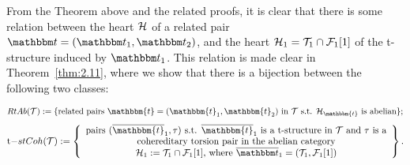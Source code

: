 From the Theorem above and the related proofs, it is clear that there is some relation between the heart
$\mathcal{H}$ of a related pair $\t=(\t_1,\t_2)$, and the heart $\mathcal{H}_1=\mathcal{T}_1\cap\mathcal{F}_1[1]$ of the t-structure induced by $\t_1$.
This relation is made clear in Theorem~\ref{thm:2.11}, where we show that there is a bijection between the following two classes:

\[RtAb(\mathcal{T}):=\{\text{related pairs }\mathbbm{t}=(\mathbbm{t}_1,\mathbbm{t}_2)
\text{ in }\mathcal{T}\text{ s.t. }\mathcal{H}_\mathbbm{t}\text{ is abelian}\};\]
\begin{equation*}
  \mathrm{t-}stCoh(\mathcal{T}) :=
  \left\{
    \begin{array}{c}
      \text{pairs }(\overline{\mathbbm{t}}_1,\tau)\text{ s.t. }
      \overline{\mathbbm{t}}_1\text{ is a t-structure in }\mathcal{T}\text{ and }
      \tau\text{ is a}\\
      \text{ cohereditary torsion pair in the abelian category } \\
      \mathcal{H}_1:=\T_1\cap\F_1[1] \text{, where }\overline{\t}_1=(\T_1,\F_1[1])
    \end{array}
  \right\}.
\end{equation*}


